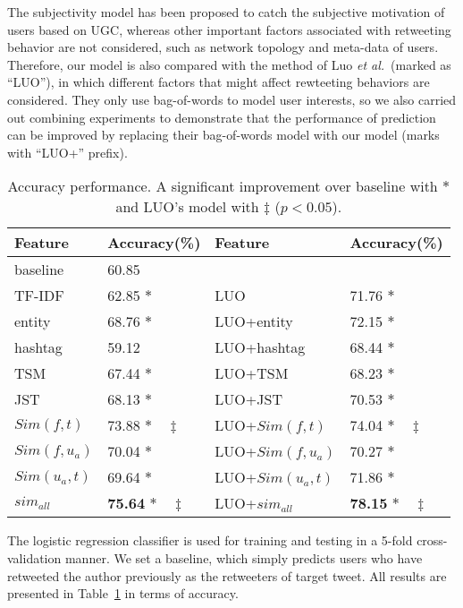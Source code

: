 The subjectivity model has been proposed to catch the subjective motivation of users based on UGC, whereas other important factors associated with retweeting behavior are not considered, such as network topology and meta-data of users. 
Therefore, our model is also compared with the method of Luo \emph{et al.}~(marked as ``LUO''), in which different factors that might affect rewteeting behaviors are considered.
They only use bag-of-words to model user interests, so we also carried out combining experiments to demonstrate that the performance of prediction can be improved by replacing their bag-of-words model with our model (marks with ``LUO+'' prefix). 
\begin{table}[htb]
\scriptsize
\centering
\caption{Accuracy performance. A significant improvement over baseline with $ \ast $ and LUO's model with $ \ddagger $ ($p < 0.05$).}
\label{tab3}
\begin{tabular}{|l|l|l|l|}
\hline
Feature & Accuracy(\%) & Feature & Accuracy(\%)\\
\hline
baseline & 60.85 & & \\
\hline
TF-IDF & 62.85   $\ast$ & LUO & 71.76 $ \ast  $\\
entity & 68.76  $\ast$ & LUO+entity & 72.15 $\ast$\\
hashtag & 59.12  & LUO+hashtag & 68.44 $\ast$\\
\hline
TSM & 67.44 $\ast$ & LUO+TSM & 68.23 $\ast$\\
JST & 68.13 $\ast$ & LUO+JST & 70.53 $\ast$\\
\hline
$ Sim(f,t) $ & 73.88   $\ast  \quad \ddagger $ &LUO+$ Sim(f,t)$ & 74.04  $ \ast \quad \ddagger $\\
$ Sim(f,u_a)  $ & 70.04   $\ast  $ & LUO+$ Sim(f,u_a)$ & 70.27  $ \ast $\\
$ Sim(u_a,t)  $ & 69.64   $\ast  $ & LUO+$ Sim(u_a,t)$ & 71.86  $ \ast $\\
$ sim_{all}  $ & \textbf{75.64}   $\ast \quad \ddagger $ & LUO+$ sim_{all}  $ & \textbf{78.15}  $ \ast \quad \ddagger $\\
\hline
\end{tabular}
\end{table}

The logistic regression classifier is used for training and testing in a 5-fold cross-validation manner.
We set a baseline, which simply predicts users who have retweeted the author previously as the retweeters of target tweet. 
All results are presented in Table~\ref{tab3} in terms of accuracy.

